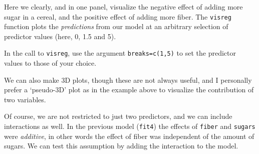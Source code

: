 \documentclass[]{book}
\newenvironment{Shaded}{\begin{snugshade}}{\end{snugshade}}
\newcommand{\CommentTok}[1]{\textcolor[rgb]{0.56,0.35,0.01}{\textit{#1}}}
\newcommand{\DataTypeTok}[1]{\textcolor[rgb]{0.13,0.29,0.53}{#1}}
\newcommand{\KeywordTok}[1]{\textcolor[rgb]{0.13,0.29,0.53}{\textbf{#1}}}
\newcommand{\NormalTok}[1]{#1}
\newcommand{\OperatorTok}[1]{\textcolor[rgb]{0.81,0.36,0.00}{\textbf{#1}}}
\newcommand{\StringTok}[1]{\textcolor[rgb]{0.31,0.60,0.02}{#1}}
\let\BeginKnitrBlock\begin \let\EndKnitrBlock\end
\begin{document}
Here we clearly, and in one panel, visualize the negative effect of adding more sugar in a cereal, and the positive effect of adding more fiber. The \texttt{visreg} function plots the \emph{predictions} from our model at an arbitrary selection of predictor values (here, 0, 1.5 and 5).

\BeginKnitrBlock{rmdtry}
In the call to \texttt{visreg}, use the argument \texttt{breaks=c(1,5)} to set the predictor values to those of your choice.
\EndKnitrBlock{rmdtry}

We can also make 3D plots, though these are not always useful, and I personally prefer a `pseudo-3D' plot as in the example above to visualize the contribution of two variables.

Of course, we are not restricted to just two predictors, and we can include interactions as well. In the previous model (\texttt{fit4}) the effects of \texttt{fiber} and \texttt{sugars} were \emph{additive}, in other words the effect of fiber was independent of the amount of sugars. We can test this assumption by adding the interaction to the model.

\begin{Shaded}
\end{Shaded}
\end{document}
